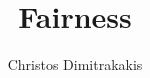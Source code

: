 \documentclass{beamer}
\title{Fairness}
\author[C. Dimitrakakis]{Christos Dimitrakakis}
\begin{document}
\begin{frame}
  \titlepage
\end{frame}


\end{document}

